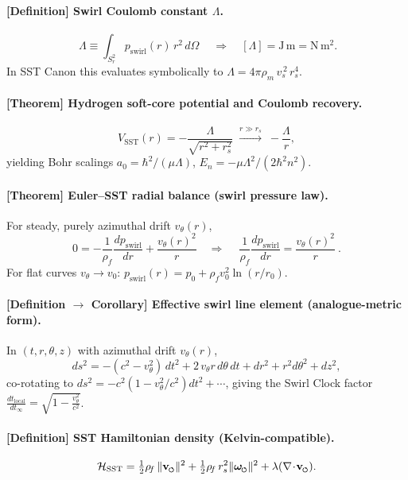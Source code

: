 \documentclass[11pt, a4paper]{article}
\newcommand{\swirlarrow}{%
    \mathchoice{\mkern-2mu\scriptstyle\boldsymbol{\circlearrowleft}}%
    {\mkern-2mu\scriptstyle\boldsymbol{\circlearrowleft}}%
    {\mkern-2mu\scriptscriptstyle\boldsymbol{\circlearrowleft}}%
    {\mkern-2mu\scriptscriptstyle\boldsymbol{\circlearrowleft}}%
}
\newcommand{\vswirl}{\mathbf{v}_{\swirlarrow}}
\newcommand{\omegas}{\boldsymbol{\omega}_{\swirlarrow}}  %
\newcommand{\vscore}{v_s}                                %
\newcommand{\rhof}{\rho_{\!f}}                           %
\newcommand{\rhom}{\rho_{\!m}}                           %
\newcommand{\rs}{r_s}                                    %
\begin{document}
    \paragraph{[Definition] Swirl Coulomb constant \(\Lambda\).}
    \[
        \boxed{\ \Lambda \equiv \int_{S_r^2} p_{\text{swirl}}(r)\, r^2\, d\Omega\ } \quad\Rightarrow\quad [\Lambda]=\mathrm{J\,m}=\mathrm{N\,m^2}.
    \]
    In SST Canon this evaluates symbolically to \( \Lambda=4\pi \rhom\, \vscore^{\,2}\, \rs^4\).

    \paragraph{[Theorem] Hydrogen soft-core potential and Coulomb recovery.}
    \[
        V_{\text{SST}}(r)=-\frac{\Lambda}{\sqrt{r^2+\rs^2}}
        \;\xrightarrow{r\gg \rs}\;
        -\frac{\Lambda}{r},
    \]
    yielding Bohr scalings
    \(a_0=\hbar^2/(\mu\Lambda)\), \(E_n=-\mu\Lambda^2/(2\hbar^2 n^2)\).

    \paragraph{[Theorem] Euler–SST radial balance (swirl pressure law).}
    For steady, purely azimuthal drift \(v_\theta(r)\),
    \[
        0=-\frac{1}{\rhof}\frac{dp_{\text{swirl}}}{dr}+\frac{v_\theta(r)^2}{r}
        \quad\Rightarrow\quad
        \boxed{\ \frac{1}{\rhof}\frac{dp_{\text{swirl}}}{dr}=\frac{v_\theta(r)^2}{r}\ }.
    \]
    For flat curves \(v_\theta\to v_0\): \(p_{\text{swirl}}(r)=p_0+\rhof v_0^2 \ln(r/r_0)\).

    \paragraph{[Definition \(\to\) Corollary] Effective swirl line element (analogue-metric form).}
    In \((t,r,\theta,z)\) with azimuthal drift \(v_\theta(r)\),
    \[
        ds^2=-(c^2-v_\theta^2)\,dt^2+2\,v_\theta r\,d\theta\,dt+dr^2+r^2d\theta^2+dz^2,
    \]
    co-rotating to \(ds^2=-c^2(1-v_\theta^2/c^2)dt^2+\cdots\), giving the Swirl Clock factor
    \(\displaystyle \frac{dt_{\text{local}}}{dt_\infty}=\sqrt{1-\frac{v_\theta^2}{c^2}}\).

    \paragraph{[Definition] SST Hamiltonian density (Kelvin-compatible).}
    \[
        \mathcal{H}_{\text{SST}}=\tfrac12\rhof\,\|\vswirl\|^2+\tfrac12\rhof\,\rs^2\|\omegas\|^2+\lambda(\nabla\!\cdot\!\vswirl).
    \]
\end{document}
